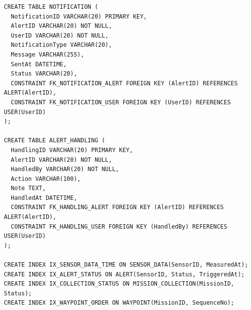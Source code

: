 \begin{lstlisting}
CREATE TABLE NOTIFICATION (
  NotificationID VARCHAR(20) PRIMARY KEY,
  AlertID VARCHAR(20) NOT NULL,
  UserID VARCHAR(20) NOT NULL,
  NotificationType VARCHAR(20),
  Message VARCHAR(255),
  SentAt DATETIME,
  Status VARCHAR(20),
  CONSTRAINT FK_NOTIFICATION_ALERT FOREIGN KEY (AlertID) REFERENCES ALERT(AlertID),
  CONSTRAINT FK_NOTIFICATION_USER FOREIGN KEY (UserID) REFERENCES USER(UserID)
);

CREATE TABLE ALERT_HANDLING (
  HandlingID VARCHAR(20) PRIMARY KEY,
  AlertID VARCHAR(20) NOT NULL,
  HandledBy VARCHAR(20) NOT NULL,
  Action VARCHAR(100),
  Note TEXT,
  HandledAt DATETIME,
  CONSTRAINT FK_HANDLING_ALERT FOREIGN KEY (AlertID) REFERENCES ALERT(AlertID),
  CONSTRAINT FK_HANDLING_USER FOREIGN KEY (HandledBy) REFERENCES USER(UserID)
);

CREATE INDEX IX_SENSOR_DATA_TIME ON SENSOR_DATA(SensorID, MeasuredAt);
CREATE INDEX IX_ALERT_STATUS ON ALERT(SensorID, Status, TriggeredAt);
CREATE INDEX IX_COLLECTION_STATUS ON MISSION_COLLECTION(MissionID, Status);
CREATE INDEX IX_WAYPOINT_ORDER ON WAYPOINT(MissionID, SequenceNo);
\end{lstlisting}
